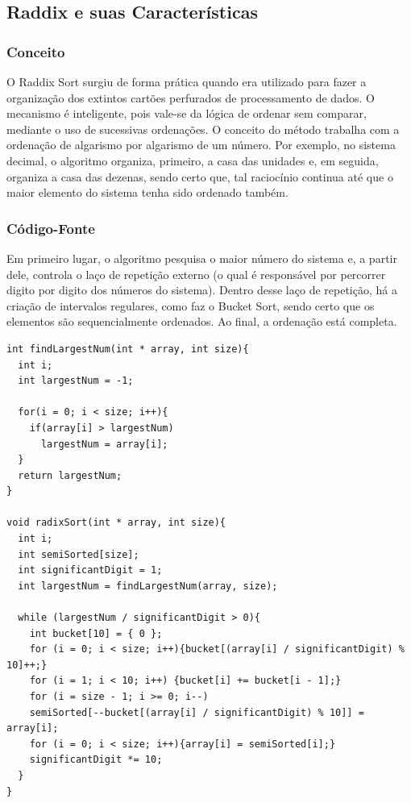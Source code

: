 \documentclass[a4paper, 12pt]{article}
\begin{document}
\vspace{0.8cm}
\subsection{Raddix e suas Características}

\subsubsection{Conceito} 
\tab{} O Raddix Sort surgiu de forma prática quando era utilizado para fazer a organização dos extintos cartões perfurados de processamento de dados. O mecanismo é inteligente, pois vale-se da lógica de ordenar sem comparar, mediante o uso de sucessivas ordenações. O conceito do método trabalha com a ordenação de algarismo por algarismo de um número. Por exemplo, no sistema decimal, o algoritmo organiza, primeiro, a casa das unidades e, em seguida, organiza a casa das dezenas, sendo certo que, tal raciocínio continua até que o maior elemento do sistema tenha sido ordenado também. 

\subsubsection{Código-Fonte} 
\tab{} Em primeiro lugar, o algoritmo pesquisa o maior número do sistema e, a partir dele, controla o laço de repetição externo (o qual é responsável por percorrer digito por digito dos números do sistema). Dentro desse laço de repetição, há a criação de intervalos regulares, como faz o Bucket Sort, sendo certo que os elementos são sequencialmente ordenados. Ao final, a ordenação está completa.

\begin{verbatim}
int findLargestNum(int * array, int size){
  int i;
  int largestNum = -1;
  
  for(i = 0; i < size; i++){
    if(array[i] > largestNum)
      largestNum = array[i];
  }  
  return largestNum;
}

void radixSort(int * array, int size){
  int i;
  int semiSorted[size];
  int significantDigit = 1;
  int largestNum = findLargestNum(array, size);
  
  while (largestNum / significantDigit > 0){  
    int bucket[10] = { 0 };
    for (i = 0; i < size; i++){bucket[(array[i] / significantDigit) % 10]++;}
    for (i = 1; i < 10; i++) {bucket[i] += bucket[i - 1];}
    for (i = size - 1; i >= 0; i--)
	semiSorted[--bucket[(array[i] / significantDigit) % 10]] = array[i];
    for (i = 0; i < size; i++){array[i] = semiSorted[i];}
    significantDigit *= 10;
  }
}
\end{verbatim}
\end{document}
